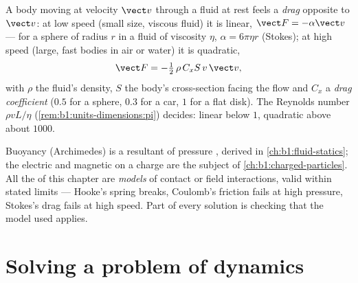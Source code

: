 \begin{proposition}\label{prop:b1:newton-dynamics:drag}
A body moving at velocity $\vect v$ through a fluid at rest feels a
\emph{drag} opposite to $\vect v$: at low speed (small size, viscous
fluid) it is linear, $\vect F = -\alpha\vect v$ --- for a sphere of
radius $r$ in a fluid of viscosity $\eta$, $\alpha = 6\pi\eta r$
(Stokes); at high speed (large, fast bodies in air or water) it is
quadratic,
\[
\vect F = -\tfrac12\,\rho\,C_xS\,v\,\vect v ,
\]
with $\rho$ the fluid's density, $S$ the body's cross-section facing
the flow and $C_x$ a  \emph{drag coefficient} ($0.5$ for a
sphere, $0.3$ for a car, $1$ for a flat disk). The Reynolds number
$\rho vL/\eta$ (\cref{rem:b1:units-dimensions:pi}) decides: linear
below $1$, quadratic above about $1000$.
\end{proposition}
\admitted

\begin{remark}\label{rem:b1:newton-dynamics:others}
Buoyancy (Archimedes) is a resultant of pressure , derived in
\cref{ch:b1:fluid-statics}; the electric and magnetic  on a
charge are the subject of \cref{ch:b1:charged-particles}. All the
 of this chapter are \emph{models} of contact or field
interactions, valid within stated limits --- Hooke's spring breaks,
Coulomb's friction fails at high pressure, Stokes's drag fails at high
speed. Part of every solution is checking that the model used applies.
\end{remark}

\section{Solving a problem of dynamics}

